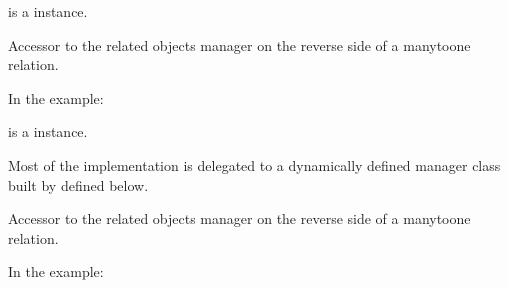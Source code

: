 \documentclass[letterpaper,10pt,english]{sphinxmanual}
\begin{document}
\begin{fulllineitems}
\begin{fulllineitems}
 is a  instance.

\end{fulllineitems}


\begin{fulllineitems}
\label{\detokenize{forums:forums.models.Post.comment1_set}}
Accessor to the related objects manager on the reverse side of a
many\sphinxhyphen{}to\sphinxhyphen{}one relation.

In the example:

\begin{sphinxVerbatim}[commandchars=\\\{\}]
 
       
\end{sphinxVerbatim}

 is a  instance.

Most of the implementation is delegated to a dynamically defined manager
class built by  defined below.

\end{fulllineitems}


\begin{fulllineitems}
\label{\detokenize{forums:forums.models.Post.comment2_set}}
Accessor to the related objects manager on the reverse side of a
many\sphinxhyphen{}to\sphinxhyphen{}one relation.

In the example:

\begin{sphinxVerbatim}[commandchars=\\\{\}]
 
       
\end{sphinxVerbatim}


\end{fulllineitems}
\end{fulllineitems}
\end{document}
